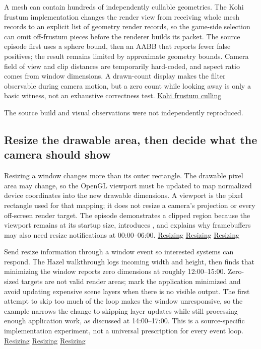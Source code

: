 A mesh can contain hundreds of independently cullable geometries. The Kohi frustum implementation changes the render view from receiving whole mesh records to an explicit list of geometry render records, so the game-side selection can omit off-frustum pieces before the renderer builds its packet. The source episode first uses a sphere bound, then an AABB that reports fewer false positives; the result remains limited by approximate geometry bounds. Camera field of view and clip distances are temporarily hard-coded, and aspect ratio comes from window dimensions. A drawn-count display makes the filter observable during camera motion, but a zero count while looking away is only a basic witness, not an exhaustive correctness test. \href{https://www.youtube.com/watch?v=vJrfcI_bMTA}{Kohi frustum culling}

The source build and visual observations were not independently reproduced.

\subsection{Resize the drawable area, then decide what the camera should show}\label{06-engine-ii-ch026-resize-the-drawable-area-then-decide-what-the-camera-should-show}

\hypertarget{06-engine-ii-ch026-resize-the-drawable-area-then-decide-what-the-camera-should-show}{}

Resizing a window changes more than its outer rectangle. The drawable pixel area may change, so the OpenGL viewport must be updated to map normalized device coordinates into the new drawable dimensions. A viewport is the pixel rectangle used for that mapping; it does not resize a camera's projection or every off-screen render target. The episode demonstrates a clipped region because the viewport remains at its startup size, introduces , and explains why framebuffers may also need resize notifications at 00:00--06:00. \href{https://www.youtube.com/watch?v=7LswjvgRqbw&t=0s}{Resizing} \href{https://www.youtube.com/watch?v=7LswjvgRqbw&t=120s}{Resizing} \href{https://www.youtube.com/watch?v=7LswjvgRqbw&t=240s}{Resizing}

Send resize information through a window event so interested systems can respond. The Hazel walkthrough logs incoming width and height, then finds that minimizing the window reports zero dimensions at roughly 12:00--15:00. Zero-sized targets are not valid render areas; mark the application minimized and avoid updating expensive scene layers when there is no visible output. The first attempt to skip too much of the loop makes the window unresponsive, so the example narrows the change to skipping layer updates while still processing enough application work, as discussed at 14:00--17:00. This is a source-specific implementation experiment, not a universal prescription for every event loop. \href{https://www.youtube.com/watch?v=7LswjvgRqbw&t=720s}{Resizing} \href{https://www.youtube.com/watch?v=7LswjvgRqbw&t=840s}{Resizing} \href{https://www.youtube.com/watch?v=7LswjvgRqbw&t=900s}{Resizing}

